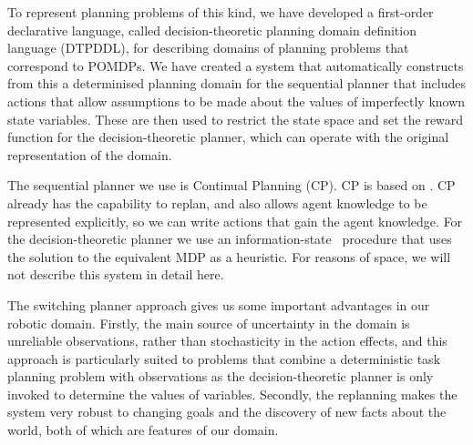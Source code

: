 To represent planning problems of this kind, we have developed a
first-order declarative language, called decision-theoretic planning
domain definition language (DTPDDL), for describing domains of
planning problems that correspond to POMDPs. We have created a system
that automatically constructs from this a determinised planning domain
for the sequential planner that includes actions that allow
assumptions to be made about the values of imperfectly known state
variables. These are then used to restrict the state space and set the
reward function for the decision-theoretic planner, which can operate
with the original representation of the domain.

The sequential planner we use is Continual
Planning \cite{brenner:nebel:jaamas09} (CP). CP is based
on \fastdownward \cite{fast-downward}. CP already has the capability
to replan, and also allows agent knowledge to be represented
explicitly, so we can write actions that gain the agent knowledge. For
the decision-theoretic planner we use an information-state
\laostar\ procedure that uses the solution to the equivalent MDP as a
heuristic. For reasons of space, we will not describe this system in
detail here.

The switching planner approach gives us some important advantages in
our robotic domain. Firstly, the main source of uncertainty in the
domain is unreliable observations, rather than stochasticity in the
action effects, and this approach is particularly suited to problems
that combine a deterministic task planning problem with observations
as the decision-theoretic planner is only invoked to determine the
values of variables. Secondly, the replanning makes the system very
robust to changing goals and the discovery of new facts about the
world, both of which are features of our domain.












